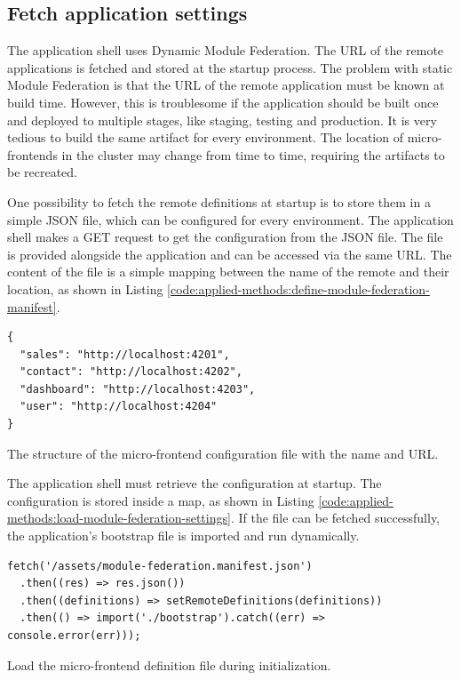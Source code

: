 \subsection{Fetch application settings}\label{subsection:applied-methods:prototypical-implementation
:load-remote-settings}

The application shell uses Dynamic Module Federation. The \ac{URL} of the remote applications is fetched and stored at the startup process. The problem with static Module Federation is that the \ac{URL} of the remote application must be known at build time. However, this is troublesome if the application should be built once and deployed to multiple stages, like staging, testing and production. It is very tedious to build the same artifact for every environment. The location of micro-frontends in the cluster may change from time to time, requiring the artifacts to be recreated.

\bigskip

\noindent One possibility to fetch the remote definitions at startup is to store them in a simple \ac{JSON} file, which can be configured for every environment. The application shell makes a GET request to get the configuration from the \ac{JSON} file. The file is provided alongside the application and can be accessed via the same \ac{URL}. The content of the file is a simple mapping between the name of the remote and their location, as shown in Listing \ref{code:applied-methods:define-module-federation-manifest}.

\ifshowListings
\begin{listing}[H]
\begin{verbatim}
{
  "sales": "http://localhost:4201",
  "contact": "http://localhost:4202",
  "dashboard": "http://localhost:4203",
  "user": "http://localhost:4204"
}
\end{verbatim}
\caption{The structure of the micro-frontend configuration file with the name and \ac{URL}.}\label{code:applied-methods:define-module-federation-manifest}
\end{listing}
\fi

\noindent The application shell must retrieve the configuration at startup. The configuration is stored inside a map, as shown in Listing \ref{code:applied-methods:load-module-federation-settings}. If the file can be fetched successfully, the application's bootstrap file is imported and run dynamically.

\ifshowListings
\begin{listing}[H]
\begin{verbatim}
fetch('/assets/module-federation.manifest.json')
  .then((res) => res.json())
  .then((definitions) => setRemoteDefinitions(definitions))
  .then(() => import('./bootstrap').catch((err) => console.error(err)));
\end{verbatim}
\caption{Load the micro-frontend definition file during initialization.}\label{code:applied-methods:load-module-federation-settings}
\end{listing}
\fi

